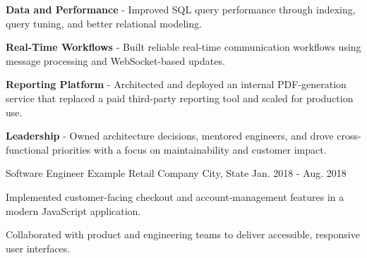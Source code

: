 \begin{cventries}
{\begin{cvsubitems}
            \item {\textbf{Data and Performance} - Improved SQL query performance through indexing, query tuning, and better relational modeling.}
            \item {\textbf{Real-Time Workflows} - Built reliable real-time communication workflows using message processing and WebSocket-based updates.}
            \item {\textbf{Reporting Platform} - Architected and deployed an internal PDF-generation service that replaced a paid third-party reporting tool and scaled for production use.}
        \end{cvsubitems}
        \begin{cvitems}
            \item {\textbf{Leadership} - Owned architecture decisions, mentored engineers, and drove cross-functional priorities with a focus on maintainability and customer impact.}
        \end{cvitems}
    }

    \cventry
    {Software Engineer}
    {Example Retail Company}
    {City, State}
    {Jan. 2018 - Aug. 2018}
    {
        \vspace{-4mm}
        \begin{cvitems}
            \item {Implemented customer-facing checkout and account-management features in a modern JavaScript application.}
            \item {Collaborated with product and engineering teams to deliver accessible, responsive user interfaces.}
        \end{cvitems}
    }
\end{cventries}
